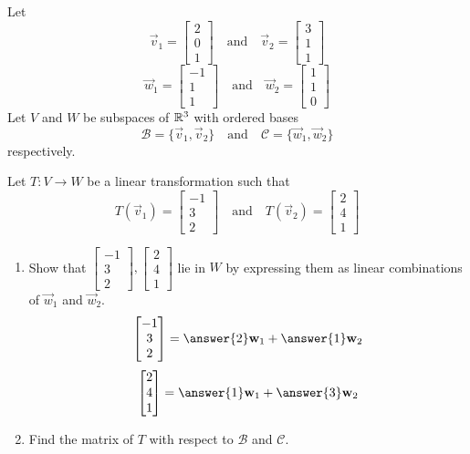 \documentclass{ximera}
\begin{document}
	\begin{problem}\label{prob:matlintransabstract2}
Let $$\vec{v}_1=\begin{bmatrix}2\\0\\1\end{bmatrix}\quad\text{and}\quad\vec{v}_2=\begin{bmatrix}3\\1\\1\end{bmatrix}$$
$$\vec{w}_1=\begin{bmatrix}-1\\1\\1\end{bmatrix}\quad\text{and}\quad\vec{w}_2=\begin{bmatrix}1\\1\\0\end{bmatrix}$$
Let $V$ and $W$ be subspaces of $\mathbb{R}^3$ with ordered bases $$\mathcal{B}=\{\vec{v}_1, \vec{v}_2\}\quad\text{and}\quad\mathcal{C}=\{\vec{w}_1, \vec{w}_2\}$$
respectively.

Let $T:V\rightarrow W$ be a linear transformation such that 
$$T(\vec{v}_1)=\begin{bmatrix}-1\\3\\2\end{bmatrix}\quad\text{and}\quad T(\vec{v}_2)=\begin{bmatrix}2\\4\\1\end{bmatrix}$$

\begin{enumerate}
    \item
    Show that $\begin{bmatrix}-1\\3\\2\end{bmatrix}, \begin{bmatrix}2\\4\\1\end{bmatrix}$ lie in $W$ by expressing them as linear combinations of $\vec{w}_1$ and $\vec{w}_2$.
     $$\begin{bmatrix}-1\\3\\2\end{bmatrix}=\answer{2}\vec{w}_1+\answer{1}\vec{w}_2$$
    $$\begin{bmatrix}2\\4\\1\end{bmatrix}=\answer{1}\vec{w}_1+\answer{3}\vec{w}_2$$
    \item
    Find the matrix of $T$ with respect to $\mathcal{B}$ and $\mathcal{C}$.
    

\end{enumerate}
\end{problem}
\end{document}
